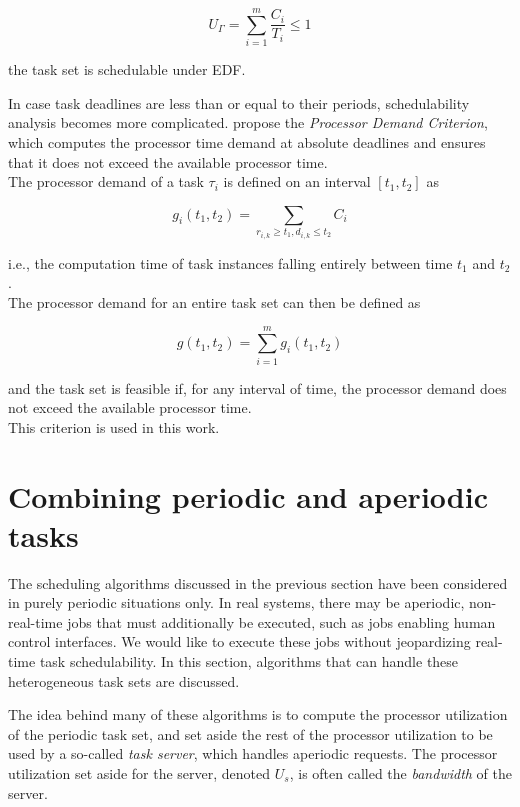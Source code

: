 \begin{equation}
    U_\Gamma = \sum_{i=1}^m \dfrac{C_i}{T_i} \le 1
\end{equation}

\noindent the task set is schedulable under EDF.

In case task deadlines are less than or equal to their periods, schedulability analysis becomes more complicated. \textcite{Baruah1990} propose the \emph{Processor Demand Criterion}, which computes the processor time demand at absolute deadlines and ensures that it does not exceed the available processor time.\\

\noindent The processor demand of a task $\tau_i$ is defined on an interval $[t_1, t_2]$ as

\begin{equation}
    g_i(t_1, t_2) = \sum_{r_{i,k} \ge t_1, d_{i,k} \le t_2} C_i
\end{equation}


\noindent i.e., the computation time of task instances falling entirely between time $t_1$ and $t_2$.\\

\noindent The processor demand for an entire task set can then be defined as

\begin{equation}
    g(t_1, t_2) = \sum_{i=1}^m g_i(t_1, t_2)
\end{equation}

\noindent and the task set is feasible if, for any interval of time, the processor demand does not exceed the available processor time.\\

\noindent This criterion is used in this work.

\section{Combining periodic and aperiodic tasks}
The scheduling algorithms discussed in the previous section have been considered in purely periodic situations only. In real systems, there may be aperiodic, non-real-time jobs that must additionally be executed, such as jobs enabling human control interfaces. We would like to execute these jobs without jeopardizing real-time task schedulability. In this section, algorithms that can handle these heterogeneous task sets are discussed.

The idea behind many of these algorithms is to compute the processor utilization of the periodic task set, and set aside the rest of the processor utilization to be used by a so-called \emph{task server}, which handles aperiodic requests. The processor utilization set aside for the server, denoted $U_s$, is often called the \emph{bandwidth} of the server.

